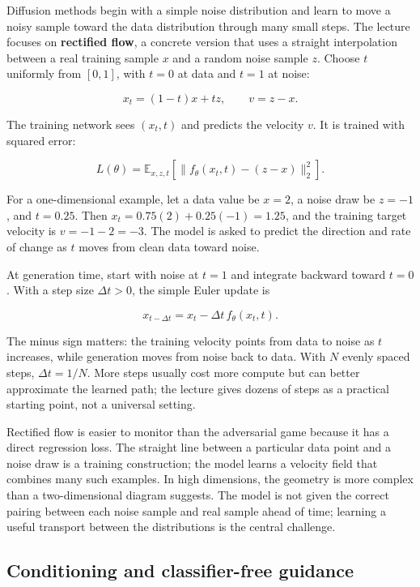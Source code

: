 Diffusion methods begin with a simple noise distribution and learn to move a noisy sample toward the data distribution through many small steps. The lecture focuses on \textbf{rectified flow}, a concrete version that uses a straight interpolation between a real training sample \(x\) and a random noise sample \(z\). Choose \(t\) uniformly from \([0,1]\), with \(t=0\) at data and \(t=1\) at noise:

\[
x_t=(1-t)x+t z,\qquad v=z-x.
\]

The training network sees \((x_t,t)\) and predicts the velocity \(v\). It is trained with squared error:

\[
L(\theta)=\mathbb{E}_{x,z,t}\left[\|f_\theta(x_t,t)-(z-x)\|_2^2\right].
\]

For a one-dimensional example, let a data value be \(x=2\), a noise draw be \(z=-1\), and \(t=0.25\). Then \(x_t=0.75(2)+0.25(-1)=1.25\), and the training target velocity is \(v=-1-2=-3\). The model is asked to predict the direction and rate of change as \(t\) moves from clean data toward noise.

At generation time, start with noise at \(t=1\) and integrate backward toward \(t=0\). With a step size \(\Delta t>0\), the simple Euler update is

\[
x_{t-\Delta t}=x_t-\Delta t\,f_\theta(x_t,t).
\]

The minus sign matters: the training velocity points from data to noise as \(t\) increases, while generation moves from noise back to data. With \(N\) evenly spaced steps, \(\Delta t=1/N\). More steps usually cost more compute but can better approximate the learned path; the lecture gives dozens of steps as a practical starting point, not a universal setting.

Rectified flow is easier to monitor than the adversarial game because it has a direct regression loss. The straight line between a particular data point and a noise draw is a training construction; the model learns a velocity field that combines many such examples. In high dimensions, the geometry is more complex than a two-dimensional diagram suggests. The model is not given the correct pairing between each noise sample and real sample ahead of time; learning a useful transport between the distributions is the central challenge.

\subsection{Conditioning and classifier-free guidance}\label{04-visual-computing-ii-ch031-conditioning-and-classifier-free-guidance}

